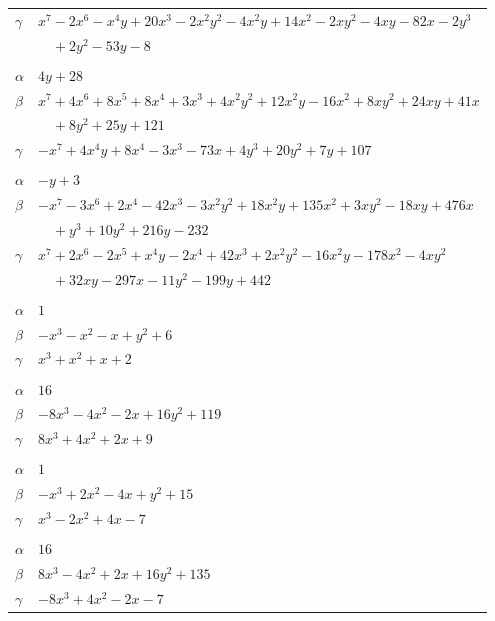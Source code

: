 \documentclass[11pt]{article}
\begin{document}
\begin{longtable}{@{}ll@{}}
$\gamma$ & $x^{7}-2x^{6}-x^{4}y+20x^{3}-2x^{2}y^{2}-4x^{2}y+14x^{2}-2xy^{2}-4xy-82x-2y^{3}$\\
 & $\quad +2y^{2}-53y-8$\\
\addlinespace[3pt]
\multicolumn{2}{@{}l}{$\{i,j\}=\{20,24\}$, $k_{ij}=2^{2}\cdot 7$}\\
$\alpha$ & $4y+28$\\
$\beta$ & $x^{7}+4x^{6}+8x^{5}+8x^{4}+3x^{3}+4x^{2}y^{2}+12x^{2}y-16x^{2}+8xy^{2}+24xy+41x$\\
 & $\quad +8y^{2}+25y+121$\\
$\gamma$ & $-x^{7}+4x^{4}y+8x^{4}-3x^{3}-73x+4y^{3}+20y^{2}+7y+107$\\
\addlinespace[3pt]
\multicolumn{2}{@{}l}{$\{i,j\}=\{25,26\}$, $k_{ij}=5^{2}$}\\
$\alpha$ & $-y+3$\\
$\beta$ & $-x^{7}-3x^{6}+2x^{4}-42x^{3}-3x^{2}y^{2}+18x^{2}y+135x^{2}+3xy^{2}-18xy+476x$\\
 & $\quad +y^{3}+10y^{2}+216y-232$\\
$\gamma$ & $x^{7}+2x^{6}-2x^{5}+x^{4}y-2x^{4}+42x^{3}+2x^{2}y^{2}-16x^{2}y-178x^{2}-4xy^{2}$\\
 & $\quad +32xy-297x-11y^{2}-199y+442$\\
\addlinespace[3pt]
\multicolumn{2}{@{}l}{$\{i,j\}=\{0,6\}$, $k_{ij}=3$}\\
$\alpha$ & $1$\\
$\beta$ & $-x^{3}-x^{2}-x+y^{2}+6$\\
$\gamma$ & $x^{3}+x^{2}+x+2$\\
\addlinespace[3pt]
\multicolumn{2}{@{}l}{$\{i,j\}=\{0,9\}$, $k_{ij}=5^{2}$}\\
$\alpha$ & $16$\\
$\beta$ & $-8x^{3}-4x^{2}-2x+16y^{2}+119$\\
$\gamma$ & $8x^{3}+4x^{2}+2x+9$\\
\addlinespace[3pt]
\multicolumn{2}{@{}l}{$\{i,j\}=\{0,10\}$, $k_{ij}=3\cdot 5$}\\
$\alpha$ & $1$\\
$\beta$ & $-x^{3}+2x^{2}-4x+y^{2}+15$\\
$\gamma$ & $x^{3}-2x^{2}+4x-7$\\
\addlinespace[3pt]
\multicolumn{2}{@{}l}{$\{i,j\}=\{0,36\}$, $k_{ij}=3^{2}$}\\
$\alpha$ & $16$\\
$\beta$ & $8x^{3}-4x^{2}+2x+16y^{2}+135$\\
$\gamma$ & $-8x^{3}+4x^{2}-2x-7$\\

\end{longtable}
\end{document}
